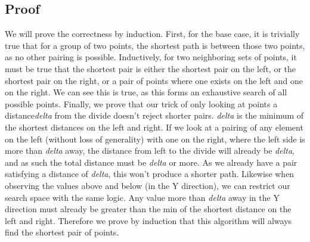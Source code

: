 \documentclass[titlepage]{article}
\numberwithin{equation}{subsection}
\begin{document}
\subsection{Proof}
We will prove the correctness by induction. First, for the base case, it is trivially true that for a group of
two points, the shortest path is between those two points, as no other pairing is possible. Inductively, for two
neighboring sets of points, it must be true that the shortest pair is either the shortest pair on the left, or
the shortest pair on the right, or a pair of points where one exists on the left and one on the right. We can see
this is true, as this forms an exhaustive search of all possible points. Finally, we prove that our trick of
only looking at points a distance\textit{delta} from the divide doesn't reject shorter pairs. \textit{delta} is the minimum of the
shortest distances on the left and right. If we look at a pairing of any element on the left (without loss of 
generality) with one on the right, where the left side is more than \textit{delta} away, the distance from left to the 
divide will already be \textit{delta}, and as such the total distance must be \textit{delta} or more. As we already have a pair
satisfying a distance of \textit{delta}, this won't produce a shorter path. Likewise when observing the values above and
below (in the Y direction), we can restrict our search space with the same logic. Any value more than \textit{delta} 
away in the Y direction must already be greater than the min of the shortest distance on the left and right.
Therefore we prove by induction that this algorithm will always find the shortest pair of points.
\end{document}
